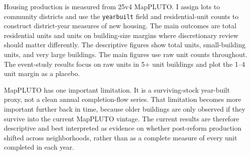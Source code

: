 Housing production is measured from 25v4 MapPLUTO.
I assign lots to community districts and use the \texttt{yearbuilt} field and residential-unit counts to construct district-year measures of new housing.
The main outcomes are total residential units and units on building-size margins where discretionary review should matter differently.
The descriptive figures show total units, small-building units, and very large buildings.
The main figures use raw unit counts throughout.
The event-study results focus on raw units in 5+ unit buildings and plot the 1--4 unit margin as a placebo.

MapPLUTO has one important limitation.
It is a surviving-stock year-built proxy, not a clean annual completion-flow series.
That limitation becomes more important further back in time, because older buildings are only observed if they survive into the current MapPLUTO vintage.
The current results are therefore descriptive and best interpreted as evidence on whether post-reform production shifted across neighborhoods, rather than as a complete measure of every unit completed in each year.
